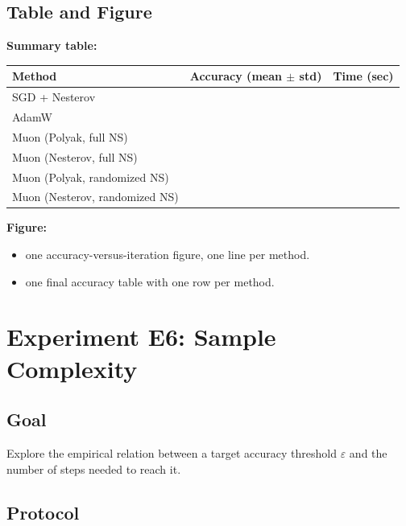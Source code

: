 \documentclass[11pt]{article}
\begin{document}
\subsection{Table and Figure}
\textbf{Summary table:}

\begin{table}[ht]
\centering
\begin{tabular}{lcc}
\toprule
\textbf{Method} & \textbf{Accuracy (mean $\pm$ std)} & \textbf{Time (sec)} \\
\midrule
SGD + Nesterov & & \\
AdamW & & \\
Muon (Polyak, full NS) & & \\
Muon (Nesterov, full NS) & & \\
Muon (Polyak, randomized NS) & & \\
Muon (Nesterov, randomized NS) & & \\
\bottomrule
\end{tabular}
\end{table}

\textbf{Figure:} 
\begin{itemize}[nosep]
    \item one accuracy-versus-iteration figure, one line per method.
    \item one final accuracy table with one row per method.
\end{itemize}


\section{Experiment E6: Sample Complexity}

\subsection{Goal}

Explore the empirical relation between a target accuracy threshold $\varepsilon$ and the number of steps needed to reach it.

\subsection{Protocol}
\end{document}
